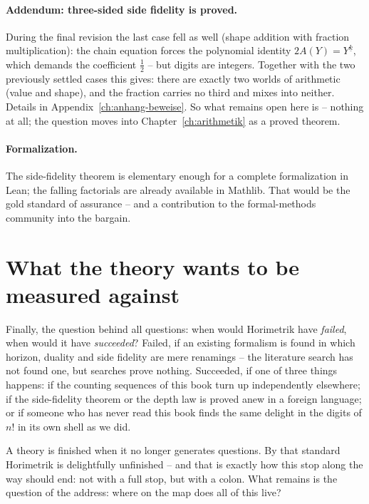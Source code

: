 \paragraph{Addendum: three-sided side fidelity is proved.}
During the final revision the last case fell as well
(shape addition with fraction multiplication): the chain equation
forces the polynomial identity $2A(Y)=Y^{\underline{k}}$, which
demands the coefficient $\tfrac12$ -- but digits are integers.
Together with the two previously settled cases this gives: there
are exactly two worlds of arithmetic (value and shape), and the
fraction carries no third and mixes into neither. Details in
Appendix~\ref{ch:anhang-beweise}. So what remains open here is --
nothing at all; the question moves into
Chapter~\ref{ch:arithmetik} as a proved theorem.

\paragraph{Formalization.} The side-fidelity theorem is elementary
enough for a complete formalization in Lean; the falling
factorials are already available in Mathlib. That would be the
gold standard of assurance -- and a contribution to the
formal-methods community into the bargain.

\section{What the theory wants to be measured against}

Finally, the question behind all questions: when would Horimetrik
have \emph{failed}, when would it have \emph{succeeded}? Failed,
if an existing formalism is found in which horizon, duality and
side fidelity are mere renamings -- the literature search has not
found one, but searches prove nothing. Succeeded, if one of three
things happens: if the counting sequences of this book turn up
independently elsewhere; if the side-fidelity theorem or the depth
law is proved anew in a foreign language; or if someone who has
never read this book finds the same delight in the digits of $n!$
in its own shell as we did.

\begin{oberflaeche}
A theory is finished when it no longer generates questions. By
that standard Horimetrik is delightfully unfinished -- and that is
exactly how this stop along the way should end: not with a full
stop, but with a colon. What remains is the question of the
address: where on the map does all of this live?
\end{oberflaeche}
